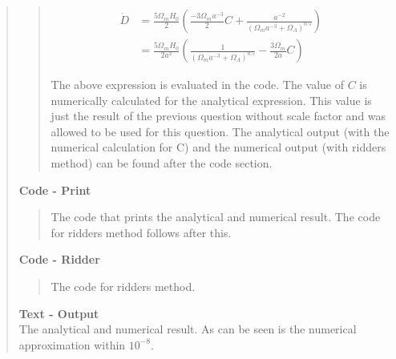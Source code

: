 \begin{quote}
\begin{quote}
\begin{align}
\dot{D} &= \frac{5 \Omega_m H_0}{2} \left( \frac{-3 \Omega_m a^{-3}}{2}C + \frac{a^{-2}}{\left( \Omega_m a^{-3} + \Omega_{\Lambda} \right)^{0.5}}  \right)  \\
&= \frac{5 \Omega_m H_0}{2 a^2} \left( \frac{1}{\left(\Omega_m a^{-3} + \Omega_{\Lambda} \right)^{0.5}} - \frac{3\Omega_m}{2a} C \right)
\end{align}

The above expression is evaluated in the code. The value of $C$ is numerically calculated for the analytical expression. This value is just the result of the previous question without scale factor and was allowed to be used for this question. The analytical output (with the numerical calculation for C) and the numerical output (with ridders method) can be found after the code section.

\end{quote}
\newpage

\textbf{Code - Print} \\

\begin{quote}
The code that prints the analytical and numerical result. The code for ridders method follows after
this.

\end{quote}

\textbf{Code - Ridder} \\

\begin{quote}
The code for ridders method.

\end{quote}

\textbf{Text - Output} \\

The analytical and numerical result. As can be seen is the numerical approximation within $10^{-8}$. 
\begin{quote}

\end{quote}
\end{quote}





